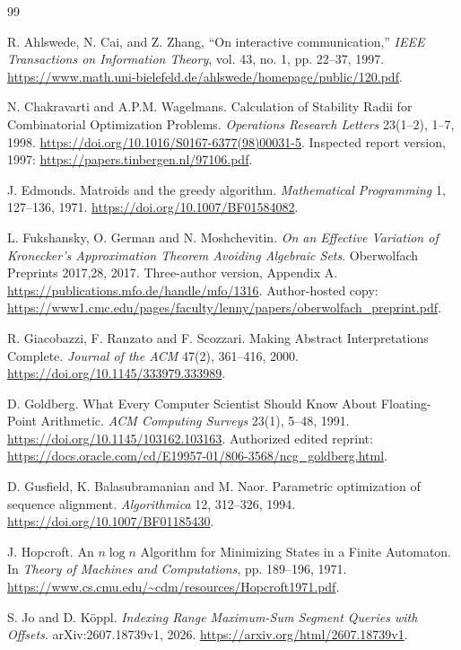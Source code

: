 \begin{thebibliography}{99}
\raggedright
{} R. Ahlswede, N. Cai, and Z. Zhang, ``On interactive communication,'' \emph{IEEE Transactions on Information Theory}, vol. 43, no. 1, pp. 22--37, 1997. \url{https://www.math.uni-bielefeld.de/ahlswede/homepage/public/120.pdf}.

 N. Chakravarti and A.P.M. Wagelmans. Calculation of Stability Radii for Combinatorial Optimization Problems. \emph{Operations Research Letters} 23(1--2), 1--7, 1998. \url{https://doi.org/10.1016/S0167-6377(98)00031-5}. Inspected report version, 1997: \url{https://papers.tinbergen.nl/97106.pdf}.

 J. Edmonds. Matroids and the greedy algorithm. \emph{Mathematical Programming} 1, 127--136, 1971. \url{https://doi.org/10.1007/BF01584082}.

 L. Fukshansky, O. German and N. Moshchevitin. \emph{On an Effective Variation of Kronecker's Approximation Theorem Avoiding Algebraic Sets}. Oberwolfach Preprints 2017,28, 2017. Three-author version, Appendix A. \url{https://publications.mfo.de/handle/mfo/1316}. Author-hosted copy: \url{https://www1.cmc.edu/pages/faculty/lenny/papers/oberwolfach_preprint.pdf}.

 R. Giacobazzi, F. Ranzato and F. Scozzari. Making Abstract Interpretations Complete. \emph{Journal of the ACM} 47(2), 361--416, 2000. \url{https://doi.org/10.1145/333979.333989}.

 D. Goldberg. What Every Computer Scientist Should Know About Floating-Point Arithmetic. \emph{ACM Computing Surveys} 23(1), 5--48, 1991. \url{https://doi.org/10.1145/103162.103163}. Authorized edited reprint: \url{https://docs.oracle.com/cd/E19957-01/806-3568/ncg_goldberg.html}.

 D. Gusfield, K. Balasubramanian and M. Naor. Parametric optimization of sequence alignment. \emph{Algorithmica} 12, 312--326, 1994. \url{https://doi.org/10.1007/BF01185430}.

 J. Hopcroft. An $n\log n$ Algorithm for Minimizing States in a Finite Automaton. In \emph{Theory of Machines and Computations}, pp. 189--196, 1971. \url{https://www.cs.cmu.edu/~cdm/resources/Hopcroft1971.pdf}.

 S. Jo and D. Köppl. \emph{Indexing Range Maximum-Sum Segment Queries with Offsets}. arXiv:2607.18739v1, 2026. \url{https://arxiv.org/html/2607.18739v1}.


\end{thebibliography}
